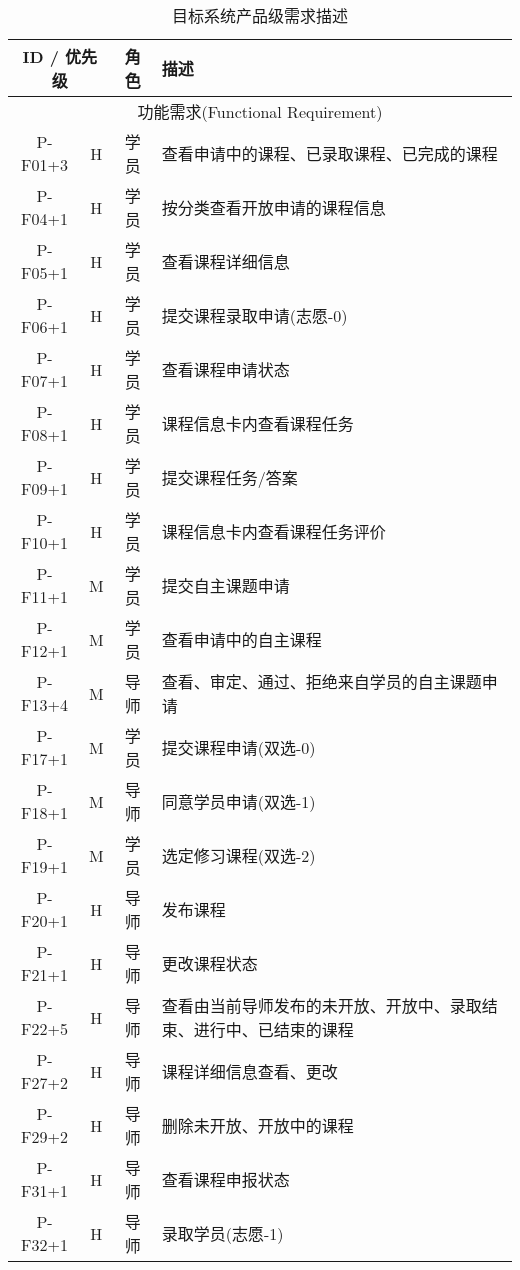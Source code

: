 \noindent
\ttfamily
\begin{longtable}{|c|c|c|X|}

  \caption{目标系统产品级需求描述}
  \\
  \hline

  \multicolumn{2}{|c|}{\textbf{ID} / \textbf{优先级}} & \textbf{角色} & \textbf{描述} \\ \hline

  \multicolumn{4}{|c|}{功能需求(Functional Requirement)} \\ \hline
  P-F01+3 & H & 学员 & 查看申请中的课程、已录取课程、已完成的课程 \\ \hline
  P-F04+1 & H & 学员 & 按分类查看开放申请的课程信息 \\ \hline
  P-F05+1 & H & 学员 & 查看课程详细信息 \\ \hline
  P-F06+1 & H & 学员 & 提交课程录取申请(志愿-0) \\ \hline
  P-F07+1 & H & 学员 & 查看课程申请状态 \\ \hline
  P-F08+1 & H & 学员 & 课程信息卡内查看课程任务 \\ \hline
  P-F09+1 & H & 学员 & 提交课程任务/答案 \\ \hline
  P-F10+1 & H & 学员 & 课程信息卡内查看课程任务评价 \\ \hline
  P-F11+1 & M & 学员 & 提交自主课题申请 \\ \hline
  P-F12+1 & M & 学员 & 查看申请中的自主课程 \\ \hline
  P-F13+4 & M & 导师 & 查看、审定、通过、拒绝来自学员的自主课题申请 \\ \hline
  P-F17+1 & M & 学员 & 提交课程申请(双选-0) \\ \hline
  P-F18+1 & M & 导师 & 同意学员申请(双选-1) \\ \hline
  P-F19+1 & M & 学员 & 选定修习课程(双选-2) \\ \hline
  P-F20+1 & H & 导师 & 发布课程 \\ \hline
  P-F21+1 & H & 导师 & 更改课程状态 \\ \hline
  P-F22+5 & H & 导师 & 查看由当前导师发布的未开放、开放中、录取结束、进行中、已结束的课程 \\ \hline
  P-F27+2 & H & 导师 & 课程详细信息查看、更改 \\ \hline
  P-F29+2 & H & 导师 & 删除未开放、开放中的课程 \\ \hline
  P-F31+1 & H & 导师 & 查看课程申报状态 \\ \hline
  P-F32+1 & H & 导师 & 录取学员(志愿-1) \\ \hline

\end{longtable}
